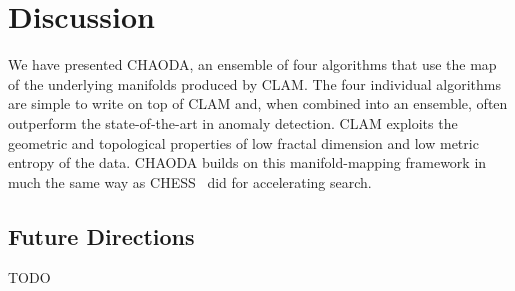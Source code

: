 \section{Discussion}
\label{sec:discussion}



We have presented CHAODA, an ensemble of four algorithms that use the map of the underlying manifolds produced by CLAM.
The four individual algorithms are simple to write on top of CLAM and, when combined into an ensemble, often outperform the state-of-the-art in anomaly detection.
CLAM exploits the geometric and topological properties of low fractal dimension and low metric entropy of the data.
CHAODA builds on this manifold-mapping framework in much the same way as CHESS~\cite{ishaq2019entropy} did for accelerating search.


\subsection{Future Directions}
\label{subsec:discussion:duture-directions}

TODO



